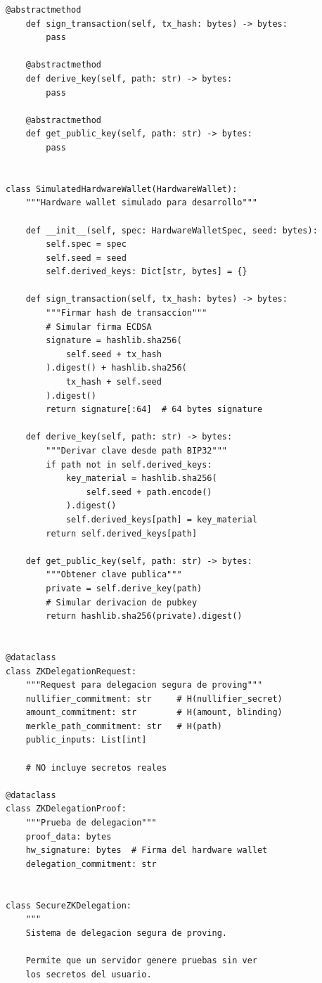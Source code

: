 \documentclass[11pt,a4paper,twoside]{book}
\theoremstyle{definition}
\theoremstyle{remark}
\begin{document}
\begin{lstlisting}[style=python, caption={Integración de hardware wallet con ZK}]
    @abstractmethod
    def sign_transaction(self, tx_hash: bytes) -> bytes:
        pass
    
    @abstractmethod
    def derive_key(self, path: str) -> bytes:
        pass
    
    @abstractmethod
    def get_public_key(self, path: str) -> bytes:
        pass


class SimulatedHardwareWallet(HardwareWallet):
    """Hardware wallet simulado para desarrollo"""
    
    def __init__(self, spec: HardwareWalletSpec, seed: bytes):
        self.spec = spec
        self.seed = seed
        self.derived_keys: Dict[str, bytes] = {}
        
    def sign_transaction(self, tx_hash: bytes) -> bytes:
        """Firmar hash de transaccion"""
        # Simular firma ECDSA
        signature = hashlib.sha256(
            self.seed + tx_hash
        ).digest() + hashlib.sha256(
            tx_hash + self.seed
        ).digest()
        return signature[:64]  # 64 bytes signature
    
    def derive_key(self, path: str) -> bytes:
        """Derivar clave desde path BIP32"""
        if path not in self.derived_keys:
            key_material = hashlib.sha256(
                self.seed + path.encode()
            ).digest()
            self.derived_keys[path] = key_material
        return self.derived_keys[path]
    
    def get_public_key(self, path: str) -> bytes:
        """Obtener clave publica"""
        private = self.derive_key(path)
        # Simular derivacion de pubkey
        return hashlib.sha256(private).digest()


@dataclass
class ZKDelegationRequest:
    """Request para delegacion segura de proving"""
    nullifier_commitment: str     # H(nullifier_secret)
    amount_commitment: str        # H(amount, blinding)
    merkle_path_commitment: str   # H(path)
    public_inputs: List[int]
    
    # NO incluye secretos reales

@dataclass
class ZKDelegationProof:
    """Prueba de delegacion"""
    proof_data: bytes
    hw_signature: bytes  # Firma del hardware wallet
    delegation_commitment: str


class SecureZKDelegation:
    """
    Sistema de delegacion segura de proving.
    
    Permite que un servidor genere pruebas sin ver
    los secretos del usuario.
    

\end{lstlisting}
\end{document}

